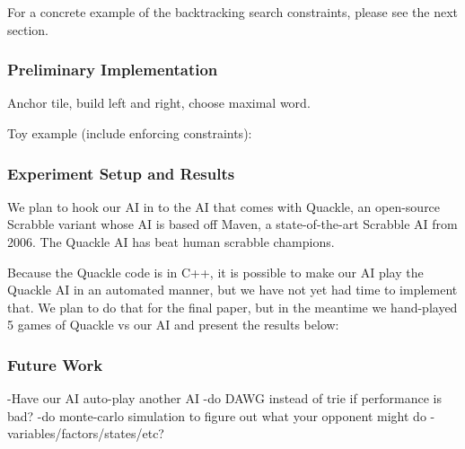 \documentclass[12pt]{article}
\begin{document}
For a concrete example of the backtracking search constraints, please
see the next section.

\subsubsection*{Preliminary Implementation}
Anchor tile, build left and right, choose maximal word.

Toy example (include enforcing constraints):


\subsubsection*{Experiment Setup and Results}
We plan to hook our AI in to the AI that comes with Quackle, an
open-source Scrabble variant whose AI is based off Maven, a
state-of-the-art Scrabble AI from 2006. The Quackle AI has beat human
scrabble champions.

Because the Quackle code is in C++, it is possible to make our AI play
the Quackle AI in an automated manner, but we have not yet had time to
implement that. We plan to do that for the final paper, but in the
meantime we hand-played 5 games of Quackle vs our AI and present the
results below:

\subsubsection*{Future Work}
-Have our AI auto-play another AI
-do DAWG instead of trie if performance is bad?
-do monte-carlo simulation to figure out what your opponent might do
-variables/factors/states/etc?
\end{document}

